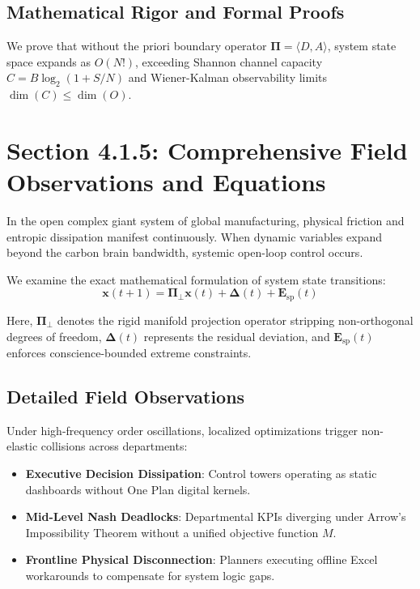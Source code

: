 \documentclass[12pt,a4paper,oneside]{book}
\begin{document}
\subsection*{Mathematical Rigor and Formal Proofs}
We prove that without the priori boundary operator $\mathbf{\Pi} = \langle D, A \rangle$, system state space expands as $O(N!)$, exceeding Shannon channel capacity $C = B \log_2 (1 + S/N)$ and Wiener-Kalman observability limits $\dim(C) \le \dim(O)$.
\clearpage
\section{Section 4.1.5: Comprehensive Field Observations and Equations}

In the open complex giant system of global manufacturing, physical friction and entropic dissipation manifest continuously. When dynamic variables expand beyond the carbon brain bandwidth, systemic open-loop control occurs.

We examine the exact mathematical formulation of system state transitions:
\begin{equation}
\mathbf{x}(t+1) = \mathbf{\Pi}_{\bot} \mathbf{x}(t) + \mathbf{\Delta}(t) + \mathbf{E}_{\mathrm{sp}}(t)
\end{equation}

Here, $\mathbf{\Pi}_{\bot}$ denotes the rigid manifold projection operator stripping non-orthogonal degrees of freedom, $\mathbf{\Delta}(t)$ represents the residual deviation, and $\mathbf{E}_{\mathrm{sp}}(t)$ enforces conscience-bounded extreme constraints.

\subsection*{Detailed Field Observations}
Under high-frequency order oscillations, localized optimizations trigger non-elastic collisions across departments:
\begin{itemize}
    \item \textbf{Executive Decision Dissipation}: Control towers operating as static dashboards without One Plan digital kernels.
    \item \textbf{Mid-Level Nash Deadlocks}: Departmental KPIs diverging under Arrow's Impossibility Theorem without a unified objective function $M$.
    \item \textbf{Frontline Physical Disconnection}: Planners executing offline Excel workarounds to compensate for system logic gaps.
\end{itemize}
\end{document}
